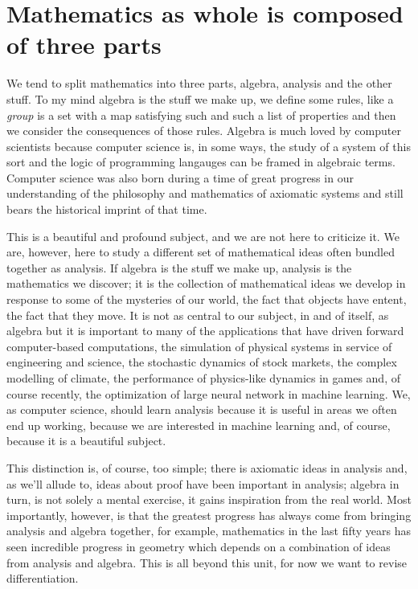 \documentclass[12pt]{article}
\begin{document}
\section*{Mathematics as whole is composed of three parts}

We tend to split mathematics into three parts, algebra, analysis and
the other stuff. To my mind algebra is the stuff we make up, we define
some rules, like a \textsl{group} is a set with a map satisfying such
and such a list of properties and then we consider the consequences of
those rules. Algebra is much loved by computer scientists because
computer science is, in some ways, the study of a system of this sort
and the logic of programming langauges can be framed in algebraic
terms. Computer science was also born during a time of great progress
in our understanding of the philosophy and mathematics of axiomatic
systems and still bears the historical imprint of that time.

This is a beautiful and profound subject, and we are not here to
criticize it. We are, however, here to study a different set of
mathematical ideas often bundled together as analysis. If algebra is
the stuff we make up, analysis is the mathematics we discover; it is
the collection of mathematical ideas we develop in response to some of
the mysteries of our world, the fact that objects have entent, the
fact that they move. It is not as central to our subject, in and of
itself, as algebra but it is important to many of the applications
that have driven forward computer-based computations, the simulation
of physical systems in service of engineering and science, the
stochastic dynamics of stock markets, the complex modelling of
climate, the performance of physics-like dynamics in games and, of
course recently, the optimization of large neural network in machine
learning. We, as computer science, should learn analysis because it is
useful in areas we often end up working, because we are interested in
machine learning and, of course, because it is a beautiful subject.

This distinction is, of course, too simple; there is axiomatic ideas
in analysis and, as we'll allude to, ideas about proof have been
important in analysis; algebra in turn, is not solely a mental
exercise, it gains inspiration from the real world. Most importantly,
however, is that the greatest progress has always come from bringing
analysis and algebra together, for example, mathematics in the last
fifty years has seen incredible progress in geometry which depends on
a combination of ideas from analysis and algebra. This is all beyond
this unit, for now we want to revise differentiation.
\end{document}
